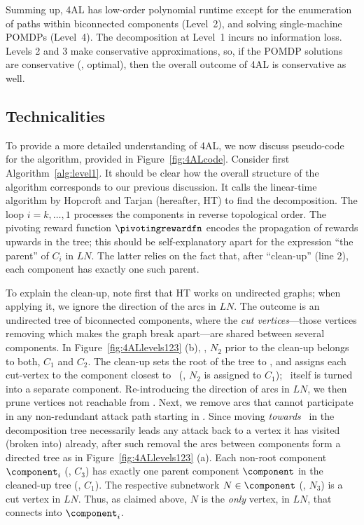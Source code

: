 Summing up, 4AL has low-order polynomial runtime except for the
enumeration of paths within biconnected components (Level~2), and
solving single-machine POMDPs (Level~4). The decomposition at Level~1
incurs no information loss. Levels 2 and 3 make conservative
approximations, so, if the POMDP solutions are conservative (\eg,
optimal), then the overall outcome of 4AL is conservative as well. 








\subsection{Technicalities}
\label{decomposition-algorithm:technicalities}




To provide a more detailed understanding of 4AL, we now discuss
pseudo-code for the algorithm, provided in
Figure~\ref{fig:4ALcode}. Consider first
Algorithm~\ref{alg:level1}. It should be clear how the overall
structure of the algorithm corresponds to our previous discussion. It
calls the linear-time algorithm by Hopcroft and Tarjan
 (hereafter, HT) to find the
decomposition. The loop $i=k,\dots,1$ processes the components in
reverse topological order. The pivoting reward function
$\pivotingrewardfn$ encodes the propagation of rewards upwards in the
tree; this should be self-explanatory apart for the expression ``the
parent'' of $C_i$ in $LN$. The latter relies on the fact that, after
``clean-up'' (line 2), each component has exactly one such parent.

To explain the clean-up, note first that HT works on undirected
graphs; when applying it, we ignore the direction of the arcs in
$LN$. The outcome is an undirected tree of biconnected components,
where the \emph{cut vertices}---those vertices removing which makes
the graph break apart---are shared between several components. In
Figure~\ref{fig:4ALlevels123} (b), \eg, $N_2$ prior to the clean-up
belongs to both, $C_1$ and $C_2$. The clean-up sets the root of the
tree to \start, and assigns each cut-vertex to the component closest
to \start\ (\eg, $N_2$ is assigned to $C_1$); \start\ itself is turned
into a separate component. Re-introducing the direction of arcs in
$LN$, we then prune vertices not reachable from \start. Next, we
remove arcs that cannot participate in any non-redundant attack path
starting in \start. Since moving \emph{towards} \start\ in the
decomposition tree necessarily leads any attack back to a vertex it
has visited (broken into) already, after such removal the arcs between
components form a directed tree as in Figure~\ref{fig:4ALlevels123}
(a). Each non-root component $\component_i$ (\eg, $C_3$) has exactly
one parent component $\component$ in the cleaned-up tree (\eg,
$C_1$). The respective subnetwork $N \in \component$ (\eg, $N_3$) is a
cut vertex in $LN$. Thus, as claimed above, $N$ is the \emph{only}
vertex, in $LN$, that connects into $\component_i$.

